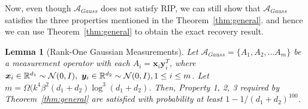 \documentclass[11pt]{article}
\newtheorem{lemma}{Lemma}
\newcommand{\calN}{{\cal N}}
\newcommand{\R}{\mathbb{R}}
\newcommand{\tp}[1]{{#1}^{T}}
\newcommand{\dist}{\mathrm{dist}}
\newcommand{\calA}{\mathcal{A}}
\newcommand{\Vo}{V_*}
\newcommand{\So}{\Sigma_*}
\newcommand{\Uo}{U_*}
\newcommand{\Wo}{W_*}
\newcommand{\x}{\bm{x}}
\newcommand{\y}{\bm{y}}
\begin{document}
Now, even though $\calA_{Gauss}$ does not satisfy RIP, we can still show that $\calA_{Gauss}$ satisfies the three properties mentioned in the Theorem~\ref{thm:general}.  and hence we can use Theorem~\ref{thm:general} to obtain the exact recovery result. %
\begin{lemma}[Rank-One Gaussian Measurements]\label{lemma:sense}
Let $\calA_{Gauss}=\{A_1, A_2, \dots A_m\}$ be a measurement operator with each $A_i=\x_i\y_i^T$, where %
$\x_i \in \R^{d_1}\sim \calN(0, I),\ \y_i \in \R^{d_2}\sim \calN(0, I), 1\leq i\leq m$. Let $m=\Omega(k^4 \beta^2 (d_1+d_2)\log^3(d_1+d_2)$. Then, Property 1, 2, 3 required by Theorem~\ref{thm:general} are satisfied with probability at least $1-1/(d_1+d_2)^{100}$. %
\end{lemma}
\end{document}
